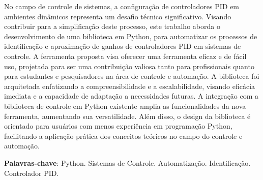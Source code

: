 \documentclass[
	12pt,				%
	openright,			%
	oneside,			%
	a4paper,			%
	english,			%
	french,				%
	spanish,			%
	brazil				%
	]{abntex2}
\begin{document}

\setlength{\absparsep}{18pt} %
\renewcommand{\baselinestretch}{1} 
\begin{resumo}
    No campo de controle de sistemas, a configuração de controladores PID em ambientes dinâmicos representa um desafio
    técnico significativo.
    Visando contribuir para a simplificação deste processo, este trabalho aborda o desenvolvimento de uma biblioteca em
    Python, para automatizar os processos de identificação e aproximação de ganhos de controladores PID em sistemas de
    controle.
    A ferramenta proposta visa oferecer uma ferramenta eficaz e de fácil uso, projetada para ser uma contribuição
    valiosa tanto para profissionais quanto para estudantes e pesquisadores na área de controle e automação.
    A biblioteca foi arquitetada enfatizando a compreensibilidade e a escalabilidade, visando eficácia imediata e a
    capacidade de adaptação a necessidades futuras.
    A integração com a biblioteca de controle em Python existente amplia as funcionalidades da nova ferramenta,
    aumentando sua versatilidade.
    Além disso, o design da biblioteca é orientado para usuários com menos experiência em programação Python,
    facilitando a aplicação prática dos conceitos teóricos no campo do controle e automação.
 
   \noindent 
    \textbf{Palavras-chave}: Python. Sistemas de Controle. Automatização. Identificação. Controlador PID.
\end{resumo}
\end{document}
